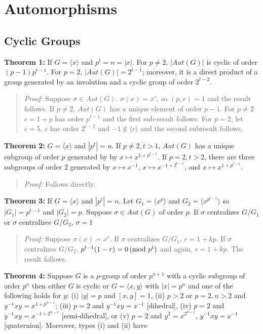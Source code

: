 \chapter{Automorphisms}
\section {Cyclic Groups}
{\bf Theorem 1:}
If $G= \langle x \rangle $ and $p^t=n=|x|$.  For $p \ne 2$, $|Aut(G)|$ is cyclic of order $(p-1)p^{t-1}$.
For $p=2$, $|Aut(G)|= 2^{t-1}$;
moreover, it is a direct product of a group generated by an  involution and a cyclic group of order $2^{t-2}$.
\begin{quote}
\emph{Proof:} Suppose $\sigma \in Aut(G)$.  $\sigma(x)= x^r$, so $(p,r)=1$ and the result follows.
If $p \ne 2$, $Aut(G)$ has a unique element of order $p-1$. For $p \ne 2$ $c= 1+p$
has order $p^{t-1}$ and the first sub-result follows.  For $p=2$, let $c=5$.  $c$ has order $2^{t-2}$ and
$-1 \notin \langle c \rangle$ and the second subresult follows.
\end{quote}
{\bf Theorem 2:} $G= \langle x \rangle $ and $|p^t|=n$.  If $p \ne 2, t>1$, $Aut(G)$ has a unique subgroup of order
$p$ generated by by $x \mapsto x^{1+p^{t-1}}$.  If $p=2, t > 2$, there are three subgroups of order $2$ generated by
$x \mapsto x^{-1}$,
$x \mapsto x^{-1 + 2^{t-1}}$, and
$x \mapsto x^{1 + p^{t-1}}$.
\begin{quote}
\emph{Proof:} Follows directly.
\end{quote}
{\bf Theorem 3:} If $G= \langle x \rangle $ and $|p^t|=n$. Let 
$G_1 = \langle x^{p} \rangle$ and
$G_2 = \langle x^{p^{t-1}} \rangle$ so $|G_1| = p^{t-1}$ and $|G_2|=p$. Suppose $\sigma \in Aut(G)$
of order $p$.
If $\sigma$ centralizes $G/G_1$ or $\sigma$ centralizes $G/G_2$, $\sigma = 1$
\begin{quote}
\emph{Proof:}  Suppose $\sigma(x) = x^r$.
If $\sigma$ centralizes $G/G_1$, $r=1+kp$.
If $\sigma$ centralizes $G/G_2$, $p^{t-1}(1-r) = 0 \thinspace \textnormal{(mod } p^t \textnormal{)}$ and again, $r=1+kp$.  The result follows.
\end{quote}
{\bf Theorem 4:} Suppose $G$ is a $p$-group of order $p^{n+1}$ with a cyclic subgroup of order $p^n$ then either
$G$ is cyclic or $G= \langle x, y \rangle$ with $|x|=p^n$ and one of the following holds for $y$:
(i) $|y| = p$ and $[x,y]=1$,
(ii) $p > 2$ or $p=2, n>2$ and $y^{-1}x y = x^{1+p^{n-1}}$;
(iii) $p=2$ and $y^{-1}x y = x^{-1}$ [dihedral],
(iv) $p=2$ and $y^{-1}x y = x^{-1 + 2^{n-1}}$ [semi-dihedral], or
(v) $p=2$ and $y^2= x^{2^{n-1}}$, $y^{-1} x y = x^{-1}$ [quaternion].  Moreover, types (i) and (ii) have

